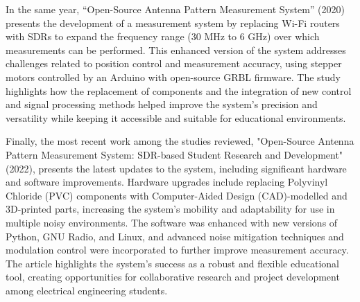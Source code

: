 In the same year, ``Open-Source Antenna Pattern Measurement System'' (2020) presents the development of a measurement system by replacing Wi-Fi routers with SDRs to expand the frequency range (30 MHz to 6 GHz) over which measurements can be performed\cite{9280870}. This enhanced version of the system addresses challenges related to position control and measurement accuracy, using stepper motors controlled by an Arduino with open-source GRBL firmware. The study highlights how the replacement of components and the integration of new control and signal processing methods helped improve the system's precision and versatility while keeping it accessible and suitable for educational environments.


Finally, the most recent work among the studies reviewed, "Open-Source Antenna Pattern Measurement System: SDR-based Student Research and Development" (2022)\cite{finger2022open}, presents the latest updates to the system, including significant hardware and software improvements. Hardware upgrades include replacing Polyvinyl Chloride (PVC) components with Computer-Aided Design (CAD)-modelled and 3D-printed parts, increasing the system's mobility and adaptability for use in multiple noisy environments. The software was enhanced with new versions of Python, GNU Radio, and Linux, and advanced noise mitigation techniques and modulation control were incorporated to further improve measurement accuracy. The article highlights the system's success as a robust and flexible educational tool, creating opportunities for collaborative research and project development among electrical engineering students.

